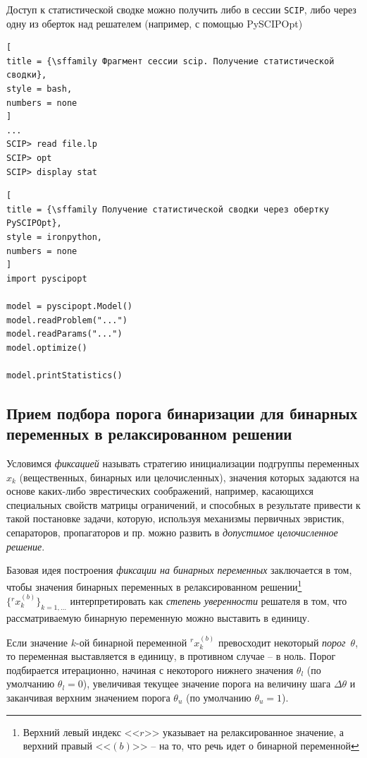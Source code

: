 \documentclass[%
	11pt,
	a4paper,
	utf8,
		]{article}
\begin{document}
Доступ к статистической сводке можно получить либо в сессии \texttt{SCIP}, либо через одну из оберток над решателем (например, с помощью PySCIPOpt)
\begin{lstlisting}[
title = {\sffamily Фрагмент сессии scip. Получение статистической сводки},
style = bash,
numbers = none
]
...
SCIP> read file.lp
SCIP> opt
SCIP> display stat
\end{lstlisting}

\begin{lstlisting}[
title = {\sffamily Получение статистической сводки через обертку PySCIPOpt},
style = ironpython,
numbers = none
]
import pyscipopt

model = pyscipopt.Model()
model.readProblem("...")
model.readParams("...")
model.optimize()

model.printStatistics()
\end{lstlisting}





\subsection{Прием подбора порога бинаризации для бинарных переменных в релаксированном решении}\label{sec:find_bin_thresh}

Условимся \emph{фиксацией} называть стратегию инициализации подгруппы переменных $ x_k $ (вещественных, бинарных или целочисленных), значения которых задаются на основе каких-либо эврестических соображений, например, касающихся специальных свойств матрицы ограничений, и способных в результате привести к такой постановке задачи, которую, используя механизмы первичных эвристик, сепараторов, пропагаторов и пр. можно развить в \emph{допустимое целочисленное решение}.

Базовая идея построения \emph{фиксации на бинарных переменных} заключается в том, чтобы значения бинарных переменных в релаксированном решении\footnote{Верхний левый индекс <<$ r $>> указывает на релаксированное значение, а верхний правый <<$ (b) $>> -- на то, что речь идет о бинарной переменной} $ {\{{}^rx^{(b)}_k\}}_{k=1, \ldots} $ интерпретировать как \emph{степень уверенности} решателя в том, что рассматриваемую бинарную переменную можно выставить в единицу.

Если значение $ k $-ой бинарной переменной $ {}^rx_k^{(b)}$ превосходит некоторый \emph{порог}~$ \theta $, то переменная выставляется в единицу, в противном случае -- в ноль. Порог подбирается итерационно, начиная с некоторого нижнего значения $ \theta_l $ (по умолчанию $ \theta_l = 0 $), увеличивая текущее значение порога на величину шага $ \Delta \theta $ и заканчивая верхним значением порога $ \theta_u $ (по умолчанию $ \theta_u = 1 $).
\end{document}
